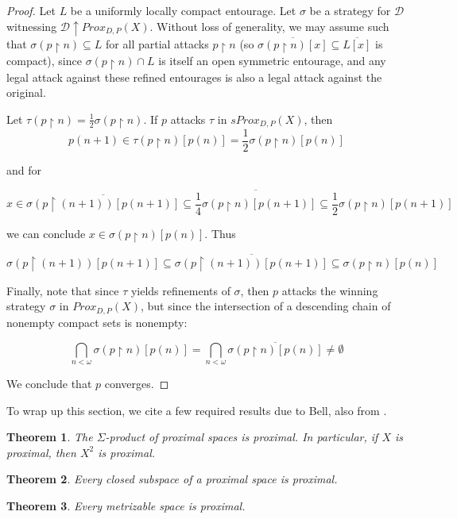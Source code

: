 \documentclass{amsart}
\newtheorem{thm}{Theorem}[section]
\theoremstyle{definition}
\theoremstyle{remark}
\newcommand{\<}{\langle}
\renewcommand{\>}{\rangle}
\newcommand{\cl}[1]{\overline{#1}}
\newcommand{\proxgame}[1]{Prox_{D,P}(#1)}
\newcommand{\sproxgame}[1]{sProx_{D,P}(#1)}
\newcommand{\pl}[1]{\mathscr{#1}}
\newcommand{\win}{\uparrow}
\newcommand{\rest}{\restriction}
\begin{document}
\begin{proof}
  Let $L$ be a uniformly locally compact entourage. Let $\sigma$ be a strategy for $\pl D$ witnessing $\pl D\win \proxgame{X}$. Without loss of generality, we may assume such that $\sigma(p\rest n)\subseteq L$ for all partial attacks $p\rest n$ (so $\cl{\sigma(p\rest n)[x]}\subseteq\cl{L[x]}$ is compact), since $\sigma(p\rest n)\cap L$ is itself an open symmetric entourage, and any legal attack against these refined entourages is also a legal attack against the original.

  Let $\tau(p\rest n)=\frac{1}{2}\sigma(p\rest n)$. If $p$ attacks $\tau$ in $\sproxgame{X}$, then
    \[
      p(n+1)
        \in
      \tau(p\rest n)[p(n)]
        =
      \frac{1}{2}\sigma(p\rest n)[p(n)]
    \]

    and for

    \[
      x
        \in
      \cl{\sigma(p\rest (n+1))[p(n+1)]}
        \subseteq
      \cl{\frac{1}{4}\sigma(p\rest n)[p(n+1)]}
        \subseteq
      \frac{1}{2}\sigma(p\rest n)[p(n+1)]
    \]

  we can conclude $x\in\sigma(p\rest n)[p(n)]$. Thus

    \[
      \sigma(p\rest (n+1))[p(n+1)]
        \subseteq
      \cl{\sigma(p\rest (n+1))[p(n+1)]}
        \subseteq
      \sigma(p\rest n)[p(n)]
    \]

  Finally, note that since $\tau$ yields refinements of $\sigma$, then $p$ attacks the winning strategy $\sigma$ in $\proxgame{X}$, but since the intersection of a descending chain of nonempty compact sets is nonempty:

    \[
      \bigcap_{n<\omega} \sigma(p\rest n)[p(n)]
        =
      \bigcap_{n<\omega} \cl{\sigma(p\rest n)[p(n)]}
        \not=
      \emptyset
    \]

  We conclude that $p$ converges.
\end{proof} 

To wrap up this section, we cite a few required results due to Bell, also from \cite{b}.

\begin{thm}
  The $\Sigma$-product of proximal spaces is proximal. In particular, if $X$ is proximal, then $X^2$ is proximal.
\end{thm}

\begin{thm}
  Every closed subspace of a proximal space is proximal.
\end{thm}

\begin{thm}
  Every metrizable space is proximal.
\end{thm}
\end{document}
